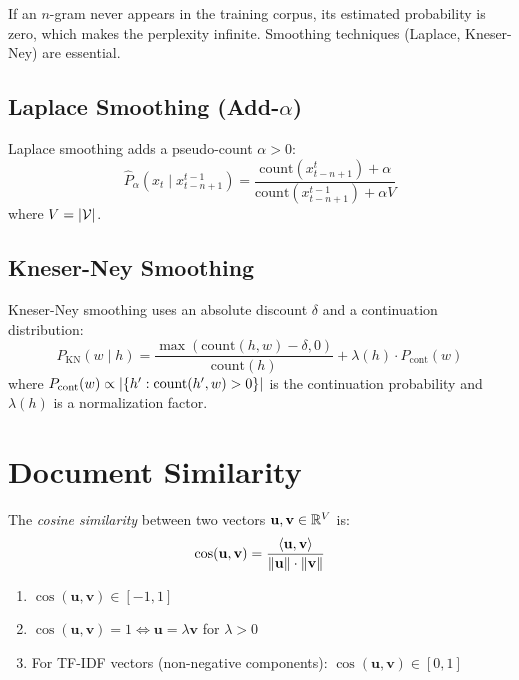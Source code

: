 \begin{warning}[title=\textbf{Zero probability problem}]
If an $n$-gram never appears in the training corpus, its estimated probability
is zero, which makes the perplexity infinite. Smoothing techniques (Laplace,
Kneser-Ney) are essential.
\end{warning}

\subsection{Laplace Smoothing (Add-$\alpha$)}

\begin{definition}
Laplace smoothing adds a pseudo-count $\alpha > 0$:
\[
\hat{P}_\alpha(x_t \mid x_{t-n+1}^{t-1}) = \frac{\text{count}(x_{t-n+1}^t) + \alpha}{\text{count}(x_{t-n+1}^{t-1}) + \alpha V}
\]
where $V = \left| \mathcal{V} \right|$.
\end{definition}

\subsection{Kneser-Ney Smoothing}

\begin{definition}
Kneser-Ney smoothing uses an absolute discount $\delta$ and a continuation
distribution:
\[
P_{\text{KN}}(w \mid h) = \frac{\max(\text{count}(h, w) - \delta, 0)}{\text{count}(h)} + \lambda(h) \cdot P_{\text{cont}}(w)
\]
where $P_{\text{cont}}(w) \propto \left| \{h' : \text{count}(h', w) > 0\} \right|$ is
the continuation probability and $\lambda(h)$ is a normalization factor.
\end{definition}

\section{Document Similarity}
\label{sec:rep:similarity}

\begin{definition}
The \emph{cosine similarity} between two vectors $\mathbf{u}, \mathbf{v} \in \mathbb{R}^V$ is:
\[
\cos(\mathbf{u}, \mathbf{v}) = \frac{\langle \mathbf{u}, \mathbf{v} \rangle}{\left\| \mathbf{u} \right\| \cdot \left\| \mathbf{v} \right\|}
\]
\end{definition}

\begin{proposition}
\begin{enumerate}
    \item $\cos(\mathbf{u}, \mathbf{v}) \in [-1, 1]$
    \item $\cos(\mathbf{u}, \mathbf{v}) = 1 \iff \mathbf{u} = \lambda \mathbf{v}$
          for $\lambda > 0$
    \item For TF-IDF vectors (non-negative components):
          $\cos(\mathbf{u}, \mathbf{v}) \in [0, 1]$
\end{enumerate}
\end{proposition}

